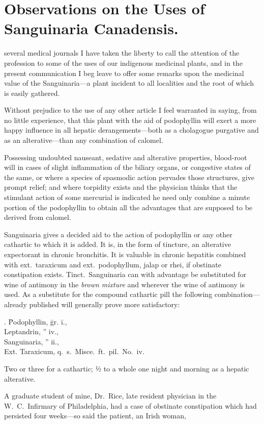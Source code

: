 \section*{Observations on the Uses of Sanguinaria
Canadensis.}


 several medical journals I have taken the liberty to call the attention
of the profession to some of the uses of our indigenous medicinal
plants, and in the present communication I beg leave to offer some
remarks upon the medicinal value of the Sanguinaria---a plant incident
to all localities and the root of which is easily gathered.

Without prejudice to the use of any other article I feel warranted in
saying, from no little experience, that this plant with the aid of podophyllin
will exert a more happy influence in all hepatic derangements---both
as a cholagogue purgative and as an alterative---than any combination
of calomel.

Possessing undoubted nauseant, sedative and alterative properties,
blood-root will in cases of slight inflammation of the biliary organs, or
congestive states of the same, or where a species of spasmodic action
pervades those structures, give prompt relief; and where torpidity
exists and the physician thinks that the stimulant action of some mercurial
is indicated he need only combine a minute portion of the
podophyllin to obtain all the advantages that are supposed to be
derived from calomel.

Sanguinaria gives a decided aid to the action of podophyllin or any
other cathartic to which it is added.   It is, in the form of tincture, an
alterative expectorant in chronic bronchitis.   It is valuable in chronic
hepatitis combined with ext.\ taraxicum and ext.\ podophyllum, jalap or
rhei, if obstinate constipation exists.    Tinct.\ Sanguinaria can with
advantage be substituted for wine of antimony in the \emph{brown mixture}
and wherever the wine of antimony is used.   As a substitute for the
compound cathartic pill the following combination---already published
will generally prove more satisfactory:

\begin{center}
\begin{tabbing}
  \prescription. \= Podophyllin, \= gr. \= i., \\
    \> Leptandrin, \> ''\> iv., \\
    \> Sanguinaria, \> ''\> ii., \\
    \> Ext. Taraxicum, q.\ s.\ Misce.\ ft.\ pil.\ No.\ iv. \\
\end{tabbing}
\end{center}
Two or three for a cathartic; ½ to a whole one night and morning as a
hepatic alterative.

A graduate student of mine, Dr.\ Rice, late resident physician in the
W.~C.\ Infirmary of Philadelphia, had a case of obstinate constipation
which had persisted four weeks---so said the patient, an Irish woman,\endinput